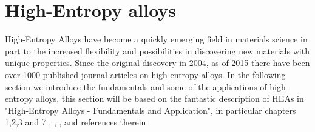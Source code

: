 \chapter{High-Entropy alloys}
\label{sec:HEA}

High-Entropy Alloys have become a quickly emerging field in materials science in part to the increased flexibility and possibilities in discovering new materials with unique properties. Since the original discovery in 2004, as of 2015 there have been over 1000 published journal articles on high-entropy alloys. In the following section we introduce the fundamentals and some of the applications of high-entropy alloys, this section will be based on the fantastic description of HEAs in "High-Entropy Alloys - Fundamentals and Application", in particular chapters 1,2,3 and 7 \cite{hea2016_ch1}, \cite{hea2016_ch2}, \cite{hea2016_ch3}, \cite{hea2016_ch7} and references therein.

